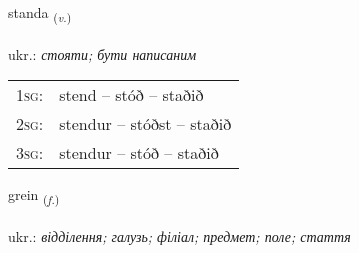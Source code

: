 \documentclass[frontgrid, backgrid]{flacards}\usepackage[]{graphicx}\usepackage[]{xcolor}
\begin{document}
{standa \small{\textsubscript{(\textit{v.})}} \\[1ex] %
\textphonetic{[stanta]} \\
ukr.: \emph{стояти; бути написаним} \\  [2ex]
\renewcommand*{\arraystretch}{0.8}
\begin{tabular}{p{1cm}l}
\textsc{1sg}: & stend -- stóð -- staðið \\ 
\textsc{2sg}: & stendur -- stóðst -- staðið \\ 
\textsc{3sg}: & stendur -- stóð -- staðið \\ 
\end{tabular}
}

\renewcommand{\flhead}{\vskip5pt \fboxsep=0pt {\small\bfseries\footnotesize Nafnorð | іменник}}
\renewcommand{\fcfoot}{\vskip5pt \fboxsep=0pt \hspace{2pt}{\small\bfseries\footnotesize 1K}}

\renewcommand{\blhead}{\vskip5pt {\small\bfseries\footnotesize Nafnorð | іменник }}
\renewcommand{\bcfoot}{\vskip5pt \hspace{2pt}{\small\bfseries\footnotesize 1K}}


{grein \small{\textsubscript{(\textit{f.})}} \\[1ex] %
\textphonetic{[kreiːn]} \\
ukr.: \emph{відділення; галузь; філіал; предмет; поле; стаття} \\  [2ex]
\renewcommand*{\arraystretch}{0.8}
}

\renewcommand{\flhead}{\vskip5pt \fboxsep=0pt {\small\bfseries\footnotesize Greinir | артикль}}
\renewcommand{\fcfoot}{\vskip5pt \fboxsep=0pt \hspace{2pt}{\small\bfseries\footnotesize 1K}}
\end{document}
